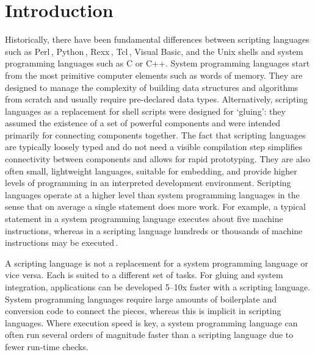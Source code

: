 \documentclass[12pt]{article}
\begin{document}

\section{Introduction}

Historically, there have been fundamental differences between
scripting languages such as
Perl\,\cite{wall99:_perl_progr_refer_guide},
Python\,\cite{martelli06:_python_nutsh},
Rexx\,\cite{o'hara88:_moder_progr_using_rexx},
Tcl\,\cite{ousterhout94:_tcl_tk_toolk}, Visual Basic, and the Unix
shells and system programming languages such as C or C++.  System
programming languages start from the most primitive computer elements
such as words of memory. They are designed to manage the complexity of
building data structures and algorithms from scratch and usually
require pre-declared data types.  Alternatively, scripting languages
as a replacement for shell scripts were designed for `gluing': they
assumed the existence of a set of powerful components and were
intended primarily for connecting components together. The fact that
scripting languages are typically loosely typed and do not need a
visible compilation step simplifies connectivity between components
and allows for rapid prototyping.  They are also often small,
lightweight languages, suitable for embedding, and provide higher
levels of programming in an interpreted development environment.
Scripting languages operate at a higher level than system programming
languages in the sense that on average a single statement does more
work. For example, a typical statement in a system programming
language executes about five machine instructions, whereas in a
scripting language hundreds or thousands of machine instructions may
be executed\,\cite{ousterhout98:_scrip}.


A scripting language is not a replacement for a system programming
language or vice versa. Each is suited to a different set of tasks.
For gluing and system integration, applications can be developed
5--10x faster with a scripting language. System programming languages
require large amounts of boilerplate and conversion code to connect
the pieces, whereas this is implicit in scripting languages. Where
execution speed is key, a system programming language can often run
several orders of magnitude faster than a scripting language due to
fewer run-time checks.
\end{document}
